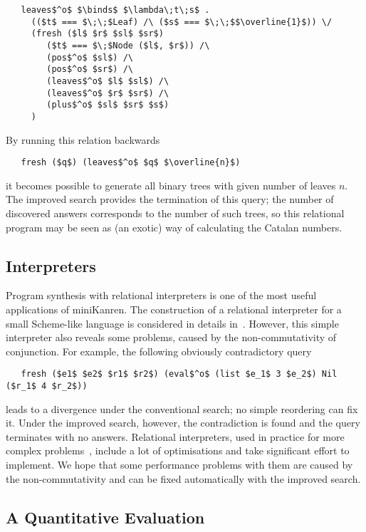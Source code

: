 \begin{lstlisting}
   leaves$^o$ $\binds$ $\lambda\;t\;s$ .
     (($t$ === $\;\;$Leaf) /\ ($s$ === $\;\;$$\overline{1}$)) \/
     (fresh ($l$ $r$ $sl$ $sr$)
        ($t$ === $\;$Node ($l$, $r$)) /\
        (pos$^o$ $sl$) /\
        (pos$^o$ $sr$) /\
        (leaves$^o$ $l$ $sl$) /\
        (leaves$^o$ $r$ $sr$) /\
        (plus$^o$ $sl$ $sr$ $s$)
     )
\end{lstlisting}

By running this relation backwards

\begin{lstlisting}
   fresh ($q$) (leaves$^o$ $q$ $\overline{n}$)
\end{lstlisting}

\noindent it becomes possible to generate all binary trees with given number of leaves $n$. 
The improved search provides the termination of this query; the number of discovered 
answers corresponds to the number of such trees, so this relational program may be seen 
as (an exotic) way of calculating the Catalan numbers.

\subsection{Interpreters}

Program synthesis with relational interpreters is one of the most useful applications of miniKanren. 
The construction of a relational interpreter for a small Scheme-like language is considered 
in details in~\cite{Untagged}. However, this simple interpreter also reveals some problems, caused by 
the non-commutativity of conjunction. For example, the following obviously contradictory query

\begin{lstlisting}
   fresh ($e1$ $e2$ $r1$ $r2$) (eval$^o$ (list $e_1$ 3 $e_2$) Nil ($r_1$ 4 $r_2$))
\end{lstlisting}

\noindent leads to a divergence under the conventional search; no simple reordering can fix it. 
Under the improved search, however, the contradiction is found and the query terminates with
no answers. Relational interpreters, used in practice for more complex problems~\cite{unified}, 
include a lot of optimisations and take significant effort to implement. We hope that some 
performance problems with them are caused by the non-commutativity and can be fixed automatically 
with the improved search.

\subsection{A Quantitative Evaluation}

